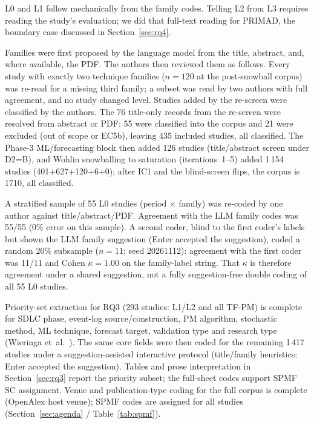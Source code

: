 \documentclass[preprint,12pt,authoryear=false]{elsarticle}
\newcommand{\PM}{TF-PM}
\begin{document}
L0 and L1 follow mechanically from the family codes. Telling L2 from L3 requires reading the study's evaluation; we did that full-text reading for PRIMAD, the boundary case discussed in Section~\ref{sec:rq4}.

Families were first proposed by the language model from the title, abstract, and, where available, the PDF. The authors then reviewed them as follows. Every study with exactly two technique families ($n = 120$ at the post-snowball corpus) was re-read for a missing third family; a subset was read by two authors with full agreement, and no study changed level. Studies added by the re-screen were classified by the authors. The 76 title-only records from the re-screen were resolved from abstract or PDF: 55 were classified into the corpus and 21 were excluded (out of scope or EC5b), leaving 435 included studies, all classified. The Phase-3 ML/forecasting block then added 126 studies (title/abstract screen under D2=B), and Wohlin snowballing to saturation (iterations~1--5) added 1\,154 studies (401+627+120+6+0); after IC1 and the blind-screen flips, the corpus is 1710, all classified.

A stratified sample of 55 L0 studies (period $\times$ family) was re-coded by one author against title/abstract/PDF. Agreement with the LLM family codes was 55/55 (0\% error on this sample). A second coder, blind to the first coder's labels but shown the LLM family suggestion (Enter accepted the suggestion), coded a random 20\% subsample ($n = 11$; seed 20261112): agreement with the first coder was 11/11 and Cohen $\kappa = 1.00$ on the family-label string. That $\kappa$ is therefore agreement under a shared suggestion, not a fully suggestion-free double coding of all 55 L0 studies.

Priority-set extraction for RQ3 (293 studies: L1/L2 and all \PM{}) is complete for SDLC phase, event-log source/construction, PM algorithm, stochastic method, ML technique, forecast target, validation type and research type (Wieringa et~al.~\cite{wieringa2006}). The same core fields were then coded for the remaining 1\,417 studies under a suggestion-assisted interactive protocol (title/family heuristics; Enter accepted the suggestion). Tables and prose interpretation in Section~\ref{sec:rq3} report the priority subset; the full-sheet codes support SPMF SC assignment. Venue and publication-type coding for the full corpus is complete (OpenAlex host venue); SPMF codes are assigned for all studies (Section~\ref{sec:agenda} / Table~\ref{tab:spmf}).
\end{document}
